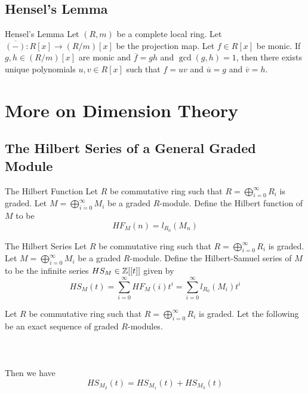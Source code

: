 \documentclass[a4paper]{article}
\begin{document}
\subsection{Hensel's Lemma}
\begin{thm}{Hensel's Lemma}{} Let $(R,m)$ be a complete local ring. Let $\overline{(-)}:R[x]\to(R/m)[x]$ be the projection map. Let $f\in R[x]$ be monic. If $g,h\in(R/m)[x]$ are monic and $\overline{f}=gh$ and $\gcd(g,h)=1$, then there exists unique polynomials $u,v\in R[x]$ such that $f=uv$ and $\overline{u}=g$ and $\overline{v}=h$. 
\end{thm}

\pagebreak
\section{More on Dimension Theory}
\subsection{The Hilbert Series of a General Graded Module}
\begin{defn}{The Hilbert Function}{} Let $R$ be commutative ring such that $R=\bigoplus_{i=0}^\infty R_i$ is graded. Let $M=\bigoplus_{i=0}^\infty M_i$ be a graded $R$-module. Define the Hilbert function of $M$ to be $$HF_M(n)=l_{R_0}(M_n)$$
\end{defn}

\begin{defn}{The Hilbert Series}{} Let $R$ be commutative ring such that $R=\bigoplus_{i=0}^\infty R_i$ is graded. Let $M=\bigoplus_{i=0}^\infty M_i$ be a graded $R$-module. Define the Hilbert-Samuel series of $M$ to be the infinite series $HS_M\in\mathbb{Z}[[t]]$ given by $$HS_M(t)=\sum_{i=0}^\infty HF_M(i)t^i=\sum_{i=0}^\infty l_{R_0}(M_i)t^i$$
\end{defn}

\begin{prp}{}{} Let $R$ be commutative ring such that $R=\bigoplus_{i=0}^\infty R_i$ is graded. Let the following be an exact sequence of graded $R$-modules. \\~\\
\\~\\
Then we have $$HS_{M_2}(t)=HS_{M_1}(t)+HS_{M_3}(t)$$
\end{prp}
\end{document}
